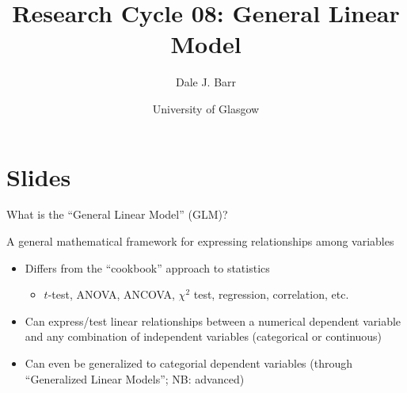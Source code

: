 \documentclass[presentation]{beamer}
\author{Dale J. Barr}
\date{University of Glasgow}
\title{Research Cycle 08: General Linear Model}
\begin{document}
\maketitle

\section*{Slides}
\label{sec:org209b55c}

\begin{frame}[label={sec:org519e389}]{What is the ``General Linear Model'' (GLM)?}
\begin{definition}
A general mathematical framework for expressing relationships
among variables
\end{definition}

\begin{itemize}
\item Differs from the ``cookbook'' approach to statistics

\begin{itemize}
\item \(t\)-test, ANOVA, ANCOVA, \(\chi^2\) test, regression, correlation, etc.
\end{itemize}

\item Can express/test linear relationships between a numerical dependent
variable and any combination of independent variables (categorical
or continuous)

\item Can even be generalized to categorial dependent variables (through
``Generalized Linear Models''; \alert{NB}: advanced)
\end{itemize}
\end{frame}
\end{document}
